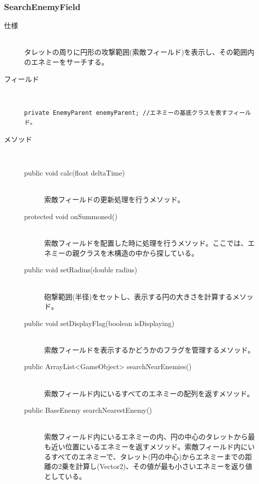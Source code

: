 \documentclass[11pt,a4j]{jarticle}
\begin{document}
\subsubsection{SearchEnemyField}
\begin{description}
    \item[仕様]\mbox{}\\
          タレットの周りに円形の攻撃範囲(索敵フィールド)を表示し、その範囲内のエネミーをサーチする。
    \item[フィールド]\mbox{}\\
          \begin{lstlisting}[caption=uectd.game.gameScene.gameMain,label=SearchEnemyField, numbers=none]
            private EnemyParent enemyParent; //エネミーの基底クラスを表すフィールド。
                \end{lstlisting}
    \item[メソッド]\mbox{}\\
          \begin{description}
              \item[public void calc(float deltaTime)]\mbox{}\\
                    索敵フィールドの更新処理を行うメソッド。
              \item[protected void onSummoned()]\mbox{}\\
                    索敵フィールドを配置した時に処理を行うメソッド。ここでは、エネミーの親クラスを木構造の中から探している。
              \item[public void setRadius(double radius)]\mbox{}\\
                    砲撃範囲(半径)をセットし、表示する円の大きさを計算するメソッド。
              \item[public void setDisplayFlag(boolean isDisplaying)]\mbox{}\\
                    索敵フィールドを表示するかどうかのフラグを管理するメソッド。
              \item[public ArrayList<GameObject> searchNearEnemies()] \mbox{}\\
                    索敵フィールド内にいるすべてのエネミーの配列を返すメソッド。
              \item[public BaseEnemy searchNearestEnemy()] \mbox{}\\
                    索敵フィールド内にいるエネミーの内、円の中心のタレットから最も近い位置にいるエネミーを返すメソッド。索敵フィールド内にいるすべてのエネミーで、タレット(円の中心)からエネミーまでの距離の2乗を計算し(Vector2)、その値が最も小さいエネミーを返り値としている。
          \end{description}
\end{description}
\end{document}
